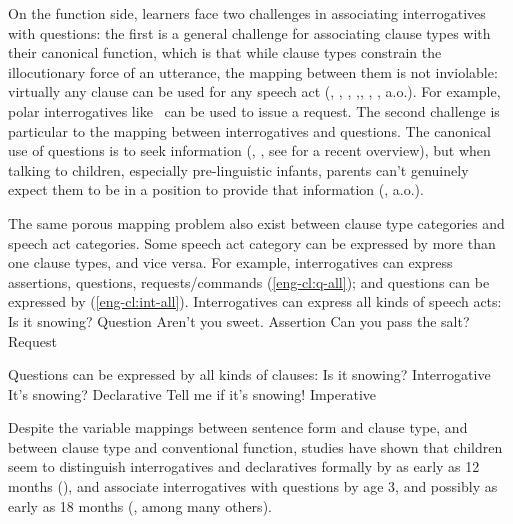 On the function side, learners face two challenges in associating interrogatives with questions: the first is a general challenge for associating clause types with their canonical function, which is that while clause types constrain the illocutionary force of an utterance, the mapping between them is not inviolable: virtually any clause can be used for any speech act (\citealt{searle1975tax}, \citealt{searle1976class}, \citealt{bachharnish1979}, \citealt{levinson1983},\citealt{searlevanderveken1985}, \citealt{portner2018}, \citealt{starr2014}, \citealt{murraystarr2020} a.o.). For example, polar interrogatives like ~can be used to issue a request. The second challenge is particular to the mapping between interrogatives and questions. The canonical use of questions is to seek information (\citealt{searle1975tax}, \citealt{levinson1983}, see \citealt{krifka2011q} for a recent overview), but when talking to children, especially pre-linguistic infants, parents can’t genuinely expect them to be in a position to provide that information (\citealt{holzman1972, shatz1978comprehension, tamir1980, yu2019pedagogical}, a.o.). %

The same porous mapping problem also exist between clause type categories and speech act categories. Some speech act category can be expressed by more than one clause types, and vice versa. For example, interrogatives can express assertions, questions, requests/commands (\ref{eng-cl:q-all}); and questions can be expressed by \diis{} (\ref{eng-cl:int-all}).
Interrogatives can express all kinds of speech acts:
\bxl Is it snowing? \hfill Question
\ex Aren't you sweet. \hfill Assertion
\ex Can you pass the salt? \hfill Request
\exl
\eex

Questions can be expressed by all kinds of clauses:
\bxl
Is it snowing? \hfill Interrogative
\ex It's snowing? \hfill Declarative
\ex Tell me if it's snowing! \hfill Imperative
\exl
\eex



Despite the variable mappings between sentence form and clause type, and between clause type and conventional function, studies have shown that children seem to distinguish interrogatives and declaratives formally by as early as 12 months (\cite{geffenmintz2015wordorder}), and associate interrogatives with questions by age 3, and possibly as early as 18 months (\citealt{tyack1977, ervintripp1978, berningergarvey1981, rowland2003cdswh, seidl2003wh, casillas2013,casillas2017turn, clark2015turn, lammertink2015turn, gagliardi2016wh, perkins2020filler}, among many others).

